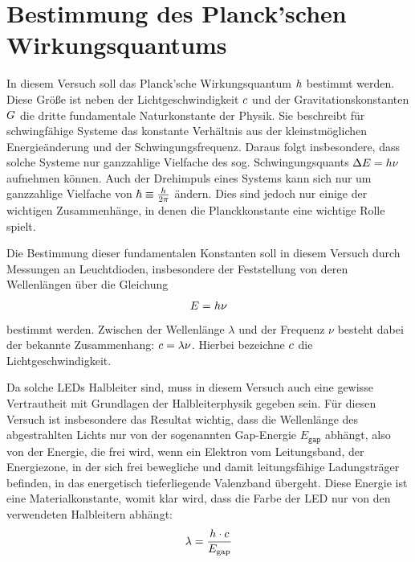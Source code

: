 \chapter{Bestimmung des Planck'schen Wirkungsquantums}
In diesem Versuch soll das Planck'sche Wirkungsquantum $h$ bestimmt werden. Diese Größe ist neben der Lichtgeschwindigkeit $c$ und der Gravitationskonstanten $G$ die dritte fundamentale Naturkonstante der Physik. Sie beschreibt für schwingfähige Systeme das konstante Verhältnis aus der kleinstmöglichen Energieänderung und der Schwingungsfrequenz. Daraus folgt insbesondere, dass solche Systeme nur ganzzahlige Vielfache des sog. Schwingungsquants $\Delta E=h\nu$ aufnehmen können. Auch der Drehimpuls eines Systems kann sich nur um ganzzahlige Vielfache von $\hbar\equiv\frac{h}{2\pi}$ ändern. Dies sind jedoch nur einige der wichtigen Zusammenhänge, in denen die Planckkonstante eine wichtige Rolle spielt.

Die Bestimmung dieser fundamentalen Konstanten soll in diesem Versuch durch Messungen an Leuchtdioden, insbesondere der Feststellung von deren Wellenlängen über die Gleichung 
\begin{equation}
	E=h\nu
\end{equation}
bestimmt werden. Zwischen der Wellenlänge $\lambda$ und der Frequenz $\nu$ besteht dabei der bekannte Zusammenhang: $c=\lambda\nu$. Hierbei bezeichne $c$ die Lichtgeschwindigkeit.

Da solche LEDs Halbleiter sind, muss in diesem Versuch auch eine gewisse Vertrautheit mit Grundlagen der Halbleiterphysik gegeben sein. Für diesen Versuch ist insbesondere das Resultat wichtig, dass die Wellenlänge des abgestrahlten Lichts nur von der sogenannten Gap-Energie $E_{\mathtt{gap}}$ abhängt, also von der Energie, die frei wird, wenn ein Elektron vom Leitungsband, der Energiezone, in der sich frei bewegliche und damit leitungsfähige Ladungsträger befinden, in das energetisch tieferliegende Valenzband übergeht. Diese Energie ist eine Materialkonstante, womit klar wird, dass die Farbe der LED nur von den verwendeten Halbleitern abhängt:
\begin{equation}
	\lambda=\frac{h\cdot c}{E_{\mathrm{gap}}}
\end{equation}
